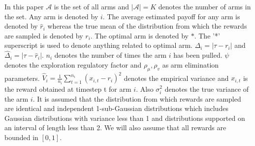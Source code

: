 In this paper $\mathcal{A}$ is the set of all arms and $|\mathcal{A}|=K$ denotes the number of arms in the set. Any arm is denoted by $i$. The average estimated payoff for any arm is denoted by $\hat{r}_{i}$ whereas the true mean of the distribution from which the rewards are sampled is denoted by $r_{i}$. The optimal arm is denoted by $*$. The '*' superscript is used to denote anything related to optimal arm.  $\Delta_{i}=|\tau-r_{i}|$ and $\hat{\Delta}_{i}=|\tau-\hat{r}_{i}|$.  $n_{i}$ denotes the number of times the arm $i$ has been pulled. $\psi $ denotes the exploration regulatory factor and $\rho_\mu ,\rho_v$ as arm elimination parameters. $\hat{V}_{i}=\frac{1}{n_i}\sum_{t=1}^{n_{i}}(x_{i,t}-r_{i})^{2}$ denotes the empirical variance and $x_{i,t}$ is the reward obtained at timestep t for arm $i$. Also  $\sigma_{i}^{2}$ denotes the true variance of the arm $i$. It is assumed that the distribution from which rewards are sampled are identical and independent 1-sub-Gaussian distributions which includes Gaussian distributions with variance less than 1 and distributions supported on an interval of length less than 2. We will also assume that all rewards are bounded in $[0,1]$.

